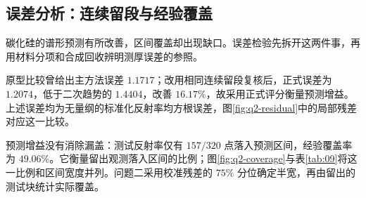 \subsection{误差分析：连续留段与经验覆盖}
\label{sec:error-analysis}

碳化硅的谱形预测有所改善，区间覆盖却出现缺口。误差检验先拆开这两件事，再用材料分项和合成回收辨明测厚误差的参照。

原型比较曾给出主方法误差 $1.1717$；改用相同连续留段复核后，正式误差为 $1.2074$，低于二次趋势的 $1.4404$，改善 $16.17\%$，故采用正式评分衡量预测增益。上述误差均为无量纲的标准化反射率均方根误差，图\ref{fig:q2-residual}中的局部残差对应这一比较。

预测增益没有消除漏盖：测试反射率仅有 $157/320$ 点落入预测区间，经验覆盖率为 $49.06\%$。它衡量留出观测落入区间的比例；图\ref{fig:q2-coverage}与表\ref{tab:09}将这一比例和区间宽度并列。问题二采用校准残差的 $75\%$ 分位确定半宽，再由留出的测试块统计实际覆盖。

